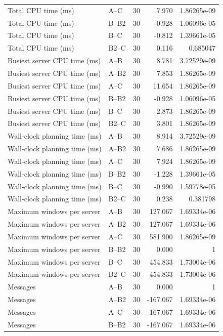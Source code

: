 \begin{table}[t]
\begin{tabular}{llrrr}
Total CPU time (ms) & A--C & 30 & 7.970 & 1.86265e-09 \\
Total CPU time (ms) & B--B2 & 30 & -0.928 & 1.06096e-05 \\
Total CPU time (ms) & B--C & 30 & -0.812 & 1.39661e-05 \\
Total CPU time (ms) & B2--C & 30 & 0.116 & 0.685047 \\
Busiest server CPU time (ms) & A--B & 30 & 8.781 & 3.72529e-09 \\
Busiest server CPU time (ms) & A--B2 & 30 & 7.853 & 1.86265e-09 \\
Busiest server CPU time (ms) & A--C & 30 & 11.654 & 1.86265e-09 \\
Busiest server CPU time (ms) & B--B2 & 30 & -0.928 & 1.06096e-05 \\
Busiest server CPU time (ms) & B--C & 30 & 2.873 & 1.86265e-09 \\
Busiest server CPU time (ms) & B2--C & 30 & 3.801 & 1.86265e-09 \\
Wall-clock planning time (ms) & A--B & 30 & 8.914 & 3.72529e-09 \\
Wall-clock planning time (ms) & A--B2 & 30 & 7.686 & 1.86265e-09 \\
Wall-clock planning time (ms) & A--C & 30 & 7.924 & 1.86265e-09 \\
Wall-clock planning time (ms) & B--B2 & 30 & -1.228 & 1.39661e-05 \\
Wall-clock planning time (ms) & B--C & 30 & -0.990 & 1.59778e-05 \\
Wall-clock planning time (ms) & B2--C & 30 & 0.238 & 0.381798 \\
Maximum windows per server & A--B & 30 & 127.067 & 1.69334e-06 \\
Maximum windows per server & A--B2 & 30 & 127.067 & 1.69334e-06 \\
Maximum windows per server & A--C & 30 & 581.900 & 1.86265e-09 \\
Maximum windows per server & B--B2 & 30 & 0.000 & 1 \\
Maximum windows per server & B--C & 30 & 454.833 & 1.73004e-06 \\
Maximum windows per server & B2--C & 30 & 454.833 & 1.73004e-06 \\
Messages & A--B & 30 & 0.000 & 1 \\
Messages & A--B2 & 30 & -167.067 & 1.69334e-06 \\
Messages & A--C & 30 & -167.067 & 1.69334e-06 \\
Messages & B--B2 & 30 & -167.067 & 1.69334e-06 \\

\end{tabular}
\end{table}
